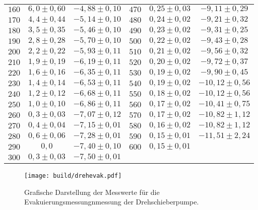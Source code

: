 \begin{table}[H]
\begin{tabular}{c c c | c c c}
    $160$ & $  6,0 \pm 0,60$  & $-4,88 \pm 0,10$ & $470$ & $ 0,25 \pm 0,03 $ & $ -9,11 \pm 0,29$ \\
    $170$ & $  4,4 \pm 0,44$  & $-5,14 \pm 0,10$ & $480$ & $ 0,24 \pm 0,02 $ & $ -9,21 \pm 0,32$ \\
    $180$ & $  3,5 \pm 0,35$  & $-5,46 \pm 0,10$ & $490$ & $ 0,23 \pm 0,02 $ & $ -9,31 \pm 0,25$ \\
    $190$ & $  2,8 \pm 0,28$  & $-5,70 \pm 0,10$ & $500$ & $ 0,22 \pm 0,02 $ & $ -9,43 \pm 0,28$ \\
    $200$ & $  2,2 \pm 0,22$  & $-5,93 \pm 0,11$ & $510$ & $ 0,21 \pm 0,02 $ & $ -9,56 \pm 0,32$ \\
    $210$ & $  1,9 \pm 0,19$  & $-6,19 \pm 0,11$ & $520$ & $ 0,20 \pm 0,02 $ & $ -9,72 \pm 0,37$ \\
    $220$ & $  1,6 \pm 0,16$  & $-6,35 \pm 0,11$ & $530$ & $ 0,19 \pm 0,02 $ & $ -9,90 \pm 0,45$ \\
    $230$ & $  1,4 \pm 0,14$  & $-6,53 \pm 0,11$ & $540$ & $ 0,19 \pm 0,02 $ & $-10,12 \pm 0,56$ \\
    $240$ & $  1,2 \pm 0,12$  & $-6,68 \pm 0,11$ & $550$ & $ 0,18 \pm 0,02 $ & $-10,12 \pm 0,56$ \\
    $250$ & $  1,0 \pm 0,10$  & $-6,86 \pm 0,11$ & $560$ & $ 0,17 \pm 0,02 $ & $-10,41 \pm 0,75$ \\
    $260$ & $  0,3 \pm 0,03$  & $-7,07 \pm 0,12$ & $570$ & $ 0,17 \pm 0,02 $ & $-10,82 \pm 1,12$ \\
    $270$ & $  0,4 \pm 0,04$  & $-7,15 \pm 0,01$ & $580$ & $ 0,16 \pm 0,02 $ & $-10,82 \pm 1,12$ \\
    $280$ & $  0,6 \pm 0,06$  & $-7,28 \pm 0,01$ & $590$ & $ 0,15 \pm 0,01 $ & $-11,51 \pm 2,24$ \\
    $290$ & $  0,0         $  & $-7,40 \pm 0,10$ & $600$ & $ 0,15 \pm 0,01 $ &                   \\
    $300$ & $  0,3 \pm 0,03$  & $-7,50 \pm 0,01$ &       &                   &                   \\
    \bottomrule
  \end{tabular}
\end{table}

\begin{figure}[H]
  \centering
  \texttt{[image: build/drehevak.pdf]}
  \caption{Grafische Darstellung der Messwerte für die Evakuierungsmessungnmessung der Drehschieberpumpe.}
  \label{fig:drehevak}
\end{figure}

